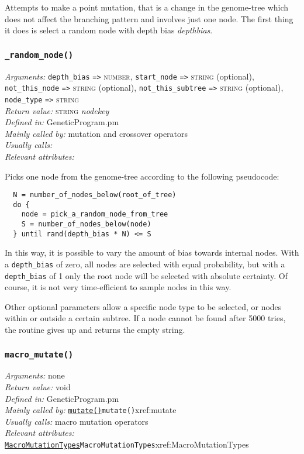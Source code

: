 \documentclass[a4paper]{article}
\begin{document}
Attempts to make a point mutation, that is a change in the genome-tree
which does not affect the branching pattern and involves just one
node.  The first thing it does is select a random node with depth bias
\textit{depthbias}.


\subsubsection{\texttt{\_random\_node()}}\label{xref:_random_node}
\begin{flushleft}
\textit{Arguments:} \texttt{depth\_bias} \verb:=>: \textsc{number}, \texttt{start\_node} \verb:=>: \textsc{string} (optional), \texttt{not\_this\_node} \verb:=>: \textsc{string} (optional), \texttt{not\_this\_subtree} \verb:=>: \textsc{string} (optional), \texttt{node\_type} \verb:=>: \textsc{string}\\
\textit{Return value:} \textsc{string} \textit{nodekey}\\
\textit{Defined in:} GeneticProgram.pm\\
\textit{Mainly called by:} mutation and crossover operators\\
\textit{Usually calls:} \\
\textit{Relevant attributes:}
\end{flushleft}

Picks one node from the genome-tree according to the following pseudocode:

\begin{verbatim}
  N = number_of_nodes_below(root_of_tree)
  do {
    node = pick_a_random_node_from_tree
    S = number_of_nodes_below(node)
  } until rand(depth_bias * N) <= S
\end{verbatim}

In this way, it is possible to vary the amount of bias towards
internal nodes.  With a \texttt{depth\_bias} of zero, all nodes are
selected with equal probability, but with a \texttt{depth\_bias} of 1
only the root node will be selected with absolute certainty.  Of
course, it is not very time-efficient to sample nodes in this way.

Other optional parameters allow a specific node type to be selected,
or nodes within or outside a certain subtree.  If a node cannot be
found after 5000 tries, the routine gives up and returns the empty
string.

\subsubsection{\texttt{macro\_mutate()}}\label{xref:macro_mutate}
\begin{flushleft}
\textit{Arguments:} none\\
\textit{Return value:} void\\
\textit{Defined in:} GeneticProgram.pm\\
\textit{Mainly called by:} \hyperref[no]{\texttt{mutate()}}{\texttt{mutate()}}{xref:mutate}\\
\textit{Usually calls:} macro mutation operators\\
\textit{Relevant attributes:} \hyperref[no]{\texttt{MacroMutationTypes}}{\texttt{MacroMutationTypes}}{xref:MacroMutationTypes}
\end{flushleft}
\end{document}
